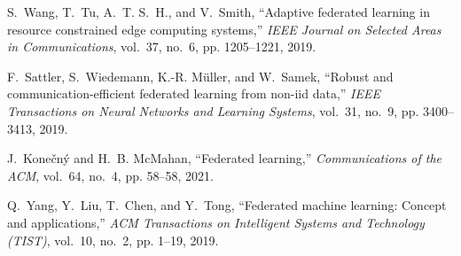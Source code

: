 \documentclass[conference]{IEEEtran}
\begin{document}
\begin{thebibliography}{1}
S.~Wang, T.~Tu, A.~T. S.~H., and V.~Smith, ``Adaptive federated learning in
  resource constrained edge computing systems,'' \emph{IEEE Journal on Selected
  Areas in Communications}, vol.~37, no.~6, pp. 1205--1221, 2019.

F.~Sattler, S.~Wiedemann, K.-R. Müller, and W.~Samek, ``Robust and
  communication-efficient federated learning from non-iid data,'' \emph{IEEE
  Transactions on Neural Networks and Learning Systems}, vol.~31, no.~9, pp.
  3400--3413, 2019.

J.~Konečný and H.~B. McMahan, ``Federated learning,'' \emph{Communications of
  the ACM}, vol.~64, no.~4, pp. 58--58, 2021.

Q.~Yang, Y.~Liu, T.~Chen, and Y.~Tong, ``Federated machine learning: Concept
  and applications,'' \emph{ACM Transactions on Intelligent Systems and
  Technology (TIST)}, vol.~10, no.~2, pp. 1--19, 2019.

\end{thebibliography}




\end{document}
